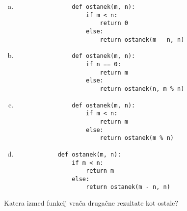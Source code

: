 \documentclass[arhiv, 10pt]{../izpit}
\begin{document}
        \begin{multicols}{2}
        \begin{enumerate}[(a)]
\item 
                \begin{verbatim}
                def ostanek(m, n):
                    if m < n:
                        return 0
                    else:
                        return ostanek(m - n, n)
                \end{verbatim}
            
\item 
                \begin{verbatim}
                def ostanek(m, n):
                    if n == 0:
                        return m
                    else:
                        return ostanek(n, m % n)
                \end{verbatim}
            
\item 
                \begin{verbatim}
                def ostanek(m, n):
                    if m < n:
                        return m
                    else:
                        return ostanek(m % n)
                \end{verbatim}
            
\item 
            \begin{verbatim}
            def ostanek(m, n):
                if m < n:
                    return m
                else:
                    return ostanek(m - n, n)
            \end{verbatim}
        
\end{enumerate}

        \end{multicols}
    
        \naloga*
        
        Katera izmed funkcij vrača drugačne rezultate kot ostale?
    
\end{document}
